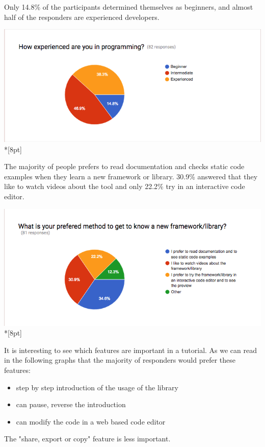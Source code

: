 \documentclass[12pt, a4paper, oneside, openright, medskipamount]{report}
\begin{document}
Only 14.8\% of the participants determined themselves as beginners, and almost half of the responders are experienced developers.

\includegraphics[width=1\textwidth]{assets/survey-result/how-experienced.png}\\*[8pt]

The majority of people prefers to read documentation and checks static code examples when they learn a new framework or library. 30.9\% answered that they like to watch videos about the tool and only 22.2\% try in an interactive code editor.

\includegraphics[width=1\textwidth]{assets/survey-result/prefered-method.png}\\*[8pt]

It is interesting to see which features are important in a tutorial. As we can read in the following graphs that the majority of responders would prefer these features:
\begin{itemize}[noitemsep]
\item step by step introduction of the usage of the library
\item can pause, reverse the introduction
\item can modify the code in a web based code editor
\end{itemize}

The "share, export or copy" feature is less important.
\end{document}

